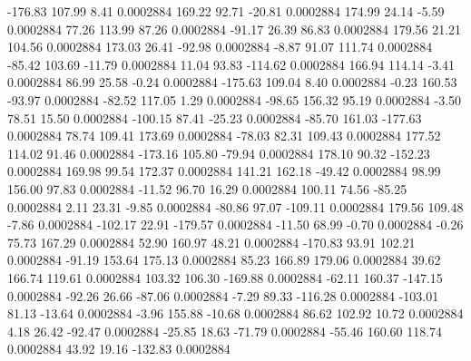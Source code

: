      -176.83      107.99        8.41     0.0002884
      169.22       92.71      -20.81     0.0002884
      174.99       24.14       -5.59     0.0002884
       77.26      113.99       87.26     0.0002884
      -91.17       26.39       86.83     0.0002884
      179.56       21.21      104.56     0.0002884
      173.03       26.41      -92.98     0.0002884
       -8.87       91.07      111.74     0.0002884
      -85.42      103.69      -11.79     0.0002884
       11.04       93.83     -114.62     0.0002884
      166.94      114.14       -3.41     0.0002884
       86.99       25.58       -0.24     0.0002884
     -175.63      109.04        8.40     0.0002884
       -0.23      160.53      -93.97     0.0002884
      -82.52      117.05        1.29     0.0002884
      -98.65      156.32       95.19     0.0002884
       -3.50       78.51       15.50     0.0002884
     -100.15       87.41      -25.23     0.0002884
      -85.70      161.03     -177.63     0.0002884
       78.74      109.41      173.69     0.0002884
      -78.03       82.31      109.43     0.0002884
      177.52      114.02       91.46     0.0002884
     -173.16      105.80      -79.94     0.0002884
      178.10       90.32     -152.23     0.0002884
      169.98       99.54      172.37     0.0002884
      141.21      162.18      -49.42     0.0002884
       98.99      156.00       97.83     0.0002884
      -11.52       96.70       16.29     0.0002884
      100.11       74.56      -85.25     0.0002884
        2.11       23.31       -9.85     0.0002884
      -80.86       97.07     -109.11     0.0002884
      179.56      109.48       -7.86     0.0002884
     -102.17       22.91     -179.57     0.0002884
      -11.50       68.99       -0.70     0.0002884
       -0.26       75.73      167.29     0.0002884
       52.90      160.97       48.21     0.0002884
     -170.83       93.91      102.21     0.0002884
      -91.19      153.64      175.13     0.0002884
       85.23      166.89      179.06     0.0002884
       39.62      166.74      119.61     0.0002884
      103.32      106.30     -169.88     0.0002884
      -62.11      160.37     -147.15     0.0002884
      -92.26       26.66      -87.06     0.0002884
       -7.29       89.33     -116.28     0.0002884
     -103.01       81.13      -13.64     0.0002884
       -3.96      155.88      -10.68     0.0002884
       86.62      102.92       10.72     0.0002884
        4.18       26.42      -92.47     0.0002884
      -25.85       18.63      -71.79     0.0002884
      -55.46      160.60      118.74     0.0002884
       43.92       19.16     -132.83     0.0002884
